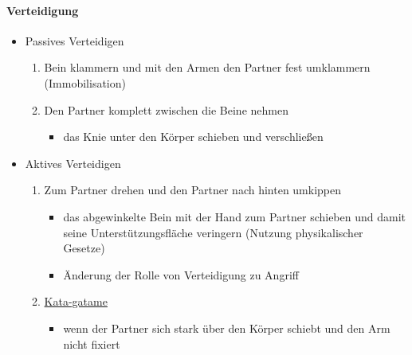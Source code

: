 \documentclass[justified, a4paper, notitlepage, captions=tableheading, nobib]{tufte-handout}
\begin{document}
\paragraph{Verteidigung}
\label{sec:orgd8abd1a}
\begin{itemize}
\item Passives Verteidigen
\begin{enumerate}
\item Bein klammern und mit den Armen den Partner fest umklammern (Immobilisation)
\item Den Partner komplett zwischen die Beine nehmen
\begin{itemize}
\item das Knie unter den Körper schieben und verschließen
\end{itemize}
\end{enumerate}
\item Aktives Verteidigen
\begin{enumerate}
\item Zum Partner drehen und den Partner nach hinten umkippen 
\begin{itemize}
\item das abgewinkelte Bein mit der Hand zum Partner schieben und damit seine Unterstützungsfläche veringern (Nutzung physikalischer Gesetze)
\item Änderung der Rolle von Verteidigung zu Angriff
\end{itemize}
\item \hyperref[org977aeb7]{Kata-gatame}
\begin{itemize}
\item wenn der Partner sich stark über den Körper schiebt und den Arm nicht fixiert
\end{itemize}
\end{enumerate}
\end{itemize}
\end{document}
